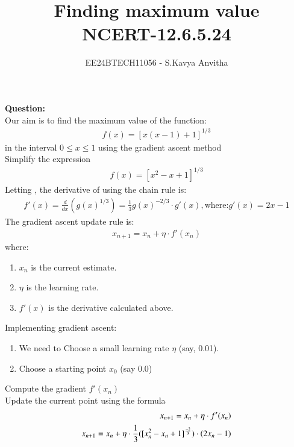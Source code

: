 \documentclass[journal]{IEEEtran}
\begin{document}

\vspace{3cm}

\title{Finding maximum value\\NCERT-12.6.5.24}
\author{EE24BTECH11056 - S.Kavya Anvitha}
\maketitle
\bigskip

\renewcommand{\thefigure}{\theenumi}
\renewcommand{\thetable}{\theenumi}
\textbf{Question:}\\
Our aim is to find the maximum value of the function:
\begin{align}
    f(x) = \left[ x(x-1) + 1 \right]^{1/3}
\end{align}
in the interval $0\leq x \leq 1$ using the gradient ascent method\\
Simplify the expression 
\begin{align}
    f(x) = \left[ x^2 - x + 1 \right]^{1/3}
\end{align}
Letting , the derivative of  using the chain rule is:
\begin{align}
f'(x) = \frac{d}{dx} \left( g(x)^{1/3} \right) = \frac{1}{3}g(x)^{-2/3} \cdot g'(x),
\text{where:}
g'(x) = 2x - 1
\end{align}
The gradient ascent update rule is:
\begin{align}
x_{n+1} = x_n + \eta \cdot f'(x_n)
\end{align}
where:\\
\begin{enumerate}
    \item $x_n$ is the current estimate.
    \item $\eta$ is the learning rate.
    \item $f'(x) $ is the derivative calculated above.
\end{enumerate}
Implementing gradient ascent:
\begin{enumerate}
    \item We need to Choose a small learning rate $\eta$ (say, 0.01).
    \item Choose a starting point $x_0$ (say 0.0)
\end{enumerate}
Compute the gradient $f'(x_n)$\\
Update the current point using the formula 
\begin{align}
x_{n+1} = x_n + \eta \cdot f'(x_n)\\
x_{n+1} = x_n + \eta \cdot \frac{1}{3}([x_n^2-x_n+1]^{\frac{-2}{3}})\cdot\left(2x_n-1\right)
\end{align}
\end{document}
